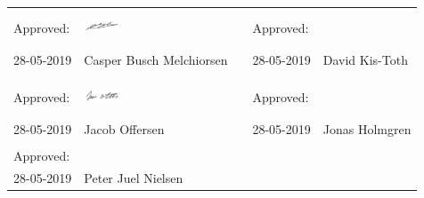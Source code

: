 \begin{table}[H]
\begin{tabular}{lllll}
Approved:  & \includegraphics[width=0.25\textwidth, height=10mm]{pictures/general/casper.PNG} &  & Approved:  &                \\ \cline{2-2} \cline{5-5} 
28-05-2019 & Casper Busch Melchiorsen &  & 28-05-2019 & David Kis-Toth \\
           &                          &  &            &                \\
Approved:  & \includegraphics[width=0.25\textwidth, height=10mm]{pictures/general/jacob.PNG} &  & Approved:  &                \\ \cline{2-2} \cline{5-5} 
28-05-2019 & Jacob Offersen           &  & 28-05-2019 & Jonas Holmgren \\
           &                          &  &            &                \\
Approved:  &                          &  &            &                \\ \cline{2-2}
28-05-2019 & Peter Juel Nielsen       &  &            &               
\end{tabular}
\end{table}